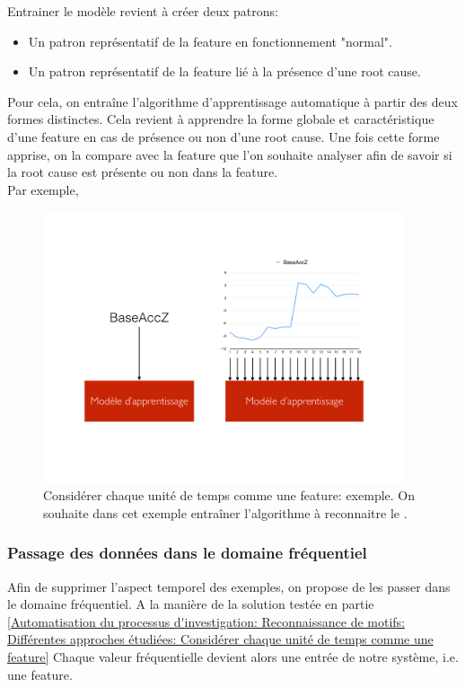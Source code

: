 Entrainer le modèle revient à créer deux patrons:  
\begin{itemize}
	\item Un patron représentatif de la feature en fonctionnement "normal".  
	\item Un patron représentatif de la feature lié à la présence d'une root cause. 
\end{itemize}

Pour cela, on entraîne l'algorithme d'apprentissage automatique à partir des deux formes distinctes. Cela revient à apprendre la forme globale et caractéristique d'une feature en cas de présence ou non d'une root cause. Une fois cette forme apprise, on la compare avec la feature que l'on souhaite analyser afin de savoir si la root cause est présente ou non dans la feature. \\
Par exemple, 

\begin{figure}[h]
	\centering\includegraphics[height=8cm]{images/unit_tps_feature.png}
	\caption[Considérer chaque unité de temps comme une feature: exemple]{Considérer chaque unité de temps comme une feature: exemple. On souhaite dans cet exemple entraîner l'algorithme à reconnaitre le .}
	\label{fig:Considérer chaque unité de temps comme une feature: exemple}
\end{figure}

\subsubsection{Passage des données dans le domaine fréquentiel}
\label{Automatisation du processus d'investigation: Reconnaissance de motifs: Différentes approches étudiées: Passage des données dans le domaine fréquentiel}
Afin de supprimer l'aspect temporel des exemples, on propose de les passer dans le domaine fréquentiel. A la manière de la solution testée en partie \ref{Automatisation du processus d'investigation: Reconnaissance de motifs: Différentes approches étudiées: Considérer chaque unité de temps comme une feature} Chaque valeur fréquentielle devient alors une entrée de notre système, i.e. une feature. \\

